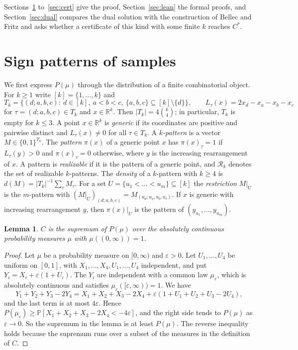 \documentclass[11pt]{amsart}
\newtheorem{lemma}[theorem]{Lemma}
\theoremstyle{definition}
\theoremstyle{remark}
\numberwithin{equation}{section}
\newcommand{\R}{\mathbb{R}}
\newcommand{\Prob}{\mathbb{P}}
\newcommand{\cR}{\mathcal{R}}
\begin{document}
Sections~\ref{sec:patterns} to~\ref{sec:cert} give the proof, Section~\ref{sec:lean} the formal proofs, and Section~\ref{sec:dual} compares the dual solution with the construction of Bellec and Fritz and asks whether a certificate of this kind with some finite $k$ reaches $C^*$.

\section{Sign patterns of samples}\label{sec:patterns}

We first express $P(\mu)$ through the distribution of a finite combinatorial object. For $k\ge1$ write $[k]=\{1,\dots,k\}$ and
\[
T_k=\bigl\{(d;a,b,c):\ d\in[k],\ a<b<c,\ \{a,b,c\}\subseteq[k]\setminus\{d\}\bigr\},\qquad L_\tau(x)=2x_d-x_a-x_b-x_c
\]
for $\tau=(d;a,b,c)\in T_k$ and $x\in\R^k$. Then $|T_k|=4\binom k4$; in particular, $T_k$ is empty for $k\le3$. A point $x\in\R^k$ is \emph{generic} if its coordinates are positive and pairwise distinct and $L_\tau(x)\ne0$ for all $\tau\in T_k$. A \emph{$k$-pattern} is a vector $M\in\{0,1\}^{T_k}$. The \emph{pattern} $\pi(x)$ of a generic point $x$ has $\pi(x)_\tau=1$ if $L_\tau(y)>0$ and $\pi(x)_\tau=0$ otherwise, where $y$ is the increasing rearrangement of $x$. A pattern is \emph{realizable} if it is the pattern of a generic point, and $\cR_k$ denotes the set of realizable $k$-patterns. The \emph{density} of a $k$-pattern with $k\ge4$ is $d(M)=|T_k|^{-1}\sum_{\tau}M_\tau$. For a set $U=\{u_1<\dots<u_m\}\subseteq[k]$ the \emph{restriction} $M|_U$ is the $m$-pattern with $(M|_U)_{(d;a,b,c)}=M_{(u_d;u_a,u_b,u_c)}$. If $x$ is generic with increasing rearrangement $y$, then $\pi(x)|_U$ is the pattern of $(y_{u_1},\dots,y_{u_m})$.

\begin{lemma}\label{lem:reduce}
$C$ is the supremum of $P(\mu)$ over the absolutely continuous probability measures $\mu$ with $\mu((0,\infty))=1$.
\end{lemma}

\begin{proof}
Let $\mu$ be a probability measure on $[0,\infty)$ and $\varepsilon>0$. Let $U_1,\dots,U_4$ be uniform on $[0,1]$, with $X_1,\dots,X_4,U_1,\dots,U_4$ independent, and put $Y_i=X_i+\varepsilon(1+U_i)$. The $Y_i$ are independent with a common law $\mu_\varepsilon$, which is absolutely continuous and satisfies $\mu_\varepsilon([\varepsilon,\infty))=1$. We have
\[
Y_1+Y_2+Y_3-2Y_4=X_1+X_2+X_3-2X_4+\varepsilon(1+U_1+U_2+U_3-2U_4),
\]
and the last term is at most $4\varepsilon$. Hence $P(\mu_\varepsilon)\ge\Prob[X_1+X_2+X_3-2X_4<-4\varepsilon]$, and the right side tends to $P(\mu)$ as $\varepsilon\to0$. So the supremum in the lemma is at least $P(\mu)$. The reverse inequality holds because the supremum runs over a subset of the measures in the definition of $C$.
\end{proof}
\end{document}
